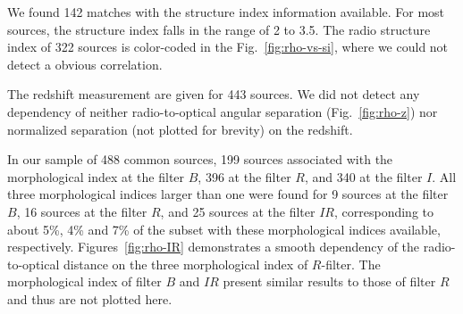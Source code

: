 \documentclass{aa}
\begin{document}
    We found 142 matches with the structure index information available.
    For most sources, the structure index falls in the range of 2 to 3.5.
    The radio structure index of 322 sources is color-coded in the Fig.~\ref{fig:rho-vs-si}, where we could not detect a obvious correlation. %

    The redshift measurement are given for 443 sources.
    We did not detect any dependency of neither radio-to-optical angular separation (Fig.~\ref{fig:rho-z}) nor normalized separation (not plotted for brevity) on the redshift.

    In our sample of 488 common sources, 199 sources associated with the morphological index at the filter $B$, 396 at the filter $R$, and 340 at the filter $I$.
    All three morphological indices larger than one were found for 9 sources at the filter $B$, 16 sources at the filter $R$, and 25 sources at the filter $IR$, corresponding to about 5\%, 4\% and 7\% of the subset with these morphological indices available, respectively.
    Figures~\ref{fig:rho-IR} demonstrates a smooth dependency of the radio-to-optical distance on the three morphological index of $R$-filter.
    The morphological index of filter $B$ and $IR$ present similar results to those of filter $R$ and thus are not plotted here.

\end{document}
